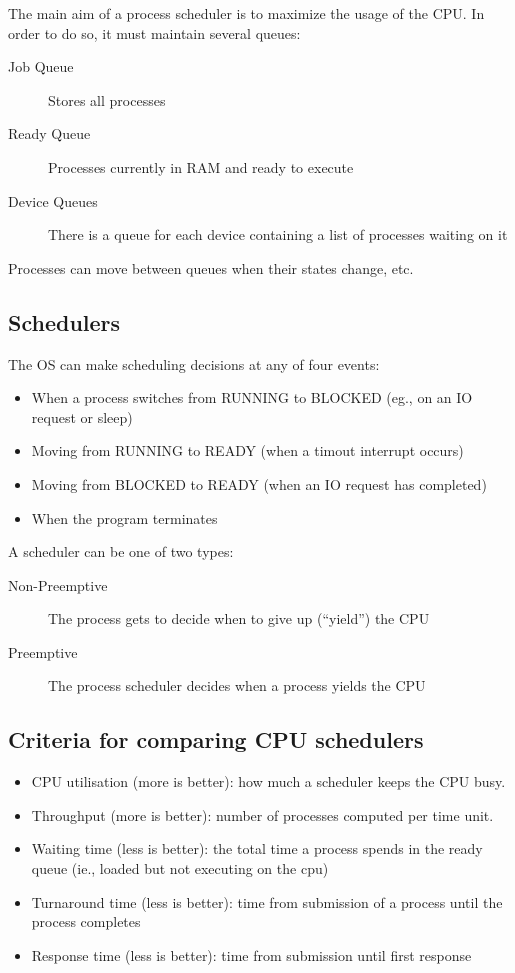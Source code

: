 The main aim of a process scheduler is to maximize the usage of the CPU.
In order to do so, it must maintain several queues:
\begin{description}
    \item[Job Queue] Stores all processes
    \item[Ready Queue] Processes currently in RAM and ready to execute
    \item[Device Queues] There is a queue for each device containing a list of processes waiting on it
\end{description}

\begin{note}
    Processes can move between queues when their states change, etc.
\end{note}

\subsection{Schedulers}\label{sub:schedulers}

The OS can make scheduling decisions at any of four events:
\begin{itemize}
    \item When a process switches from RUNNING to BLOCKED (eg., on an IO request or sleep)
    \item Moving from RUNNING to READY (when a timout interrupt occurs)
    \item Moving from BLOCKED to READY (when an IO request has completed)
    \item When the program terminates
\end{itemize}
A scheduler can be one of two types:
\begin{description}
    \item[Non-Preemptive] The process gets to decide when to give up (``yield'') the CPU
    \item[Preemptive] The process scheduler decides when a process yields the CPU
\end{description}

\subsection{Criteria for comparing CPU schedulers}\label{sub:criteria_for_comparing_cpu_shcedulers}

\begin{itemize}
    \item CPU utilisation (more is better): how much a scheduler keeps the CPU busy.
    \item Throughput (more is better): number of processes computed per time unit.
    \item Waiting time (less is better): the total time a process spends in the ready queue (ie., loaded but not executing on the cpu)
    \item Turnaround time (less is better): time from submission of a process until the process completes
    \item Response time (less is better): time from submission until first response
\end{itemize}

